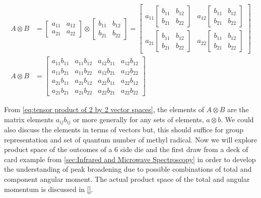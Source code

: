 \documentclass[11pt,a4paper]{book}
\begin{document}
		\begin{equation}
		\label{eq:tensor product of 2 by 2 vector spaces}
			\begin{split}
				A \otimes B &=
				\begin{bmatrix}
					a_{11} & a_{12}\\
					a_{21} & a_{22}
				\end{bmatrix}
				\otimes
				\begin{bmatrix}
					b_{11} & b_{12}\\
					b_{21} & b_{22}
				\end{bmatrix}
				=
				\begin{bmatrix}
					a_{11}	
					\begin{bmatrix}
						b_{11} & b_{12}\\
						b_{21} & b_{22}
					\end{bmatrix} & 
					a_{12}
					\begin{bmatrix}
						b_{11} & b_{12}\\
						b_{21} & b_{22}
					\end{bmatrix}\\
					a_{21} 				
					\begin{bmatrix}
						b_{11} & b_{12}\\
						b_{21} & b_{22}
					\end{bmatrix}
					& a_{22}
					\begin{bmatrix}
						b_{11} & b_{12}\\
						b_{21} & b_{22}
					\end{bmatrix}
				\end{bmatrix}\\
	A \otimes B &=
				\begin{bmatrix}
				a_{11}b_{11} & a_{11}b_{12} & a_{12}b_{11} & a_{12}b_{12}  \\
				a_{11}b_{21} & a_{11}b_{22} & a_{12}b_{21} & a_{12}b_{22}  \\
				a_{21}b_{11} & a_{21}b_{12} & a_{22}b_{11} & a_{22}b_{12} \\
				a_{21}b_{21} & a_{21}b_{22} & a_{22}b_{21} & a_{22}b_{22} 
				\end{bmatrix}
			\end{split}
		\end{equation}
		
		From \autoref{eq:tensor product of 2 by 2 vector spaces}, the elements of $A \otimes B$ are the matrix elements $a_{ij}b_{ij}$ or more generally for any sets of elements, $a \otimes b$. We could also discuss the elements in terms of vectors but, this should suffice for group representation and set of quantum number of methyl radical. Now we will explore product space of the outcomes of a 6 side die and the first draw from a deck of card example from \autoref{sec:Infrared and Microwave Spectroscopy} in order to develop the understanding of peak broadening due to possible combinations of total and component angular moment. The actual product space of the total and angular momentum is discussed in \autoref{}.
		
\end{document}
